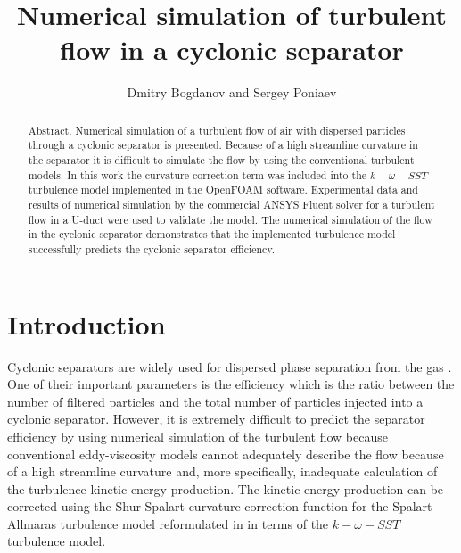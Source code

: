 \documentclass[a4paper]{jpconf}
\begin{document}

\title{Numerical simulation of turbulent flow in a cyclonic separator}

\author{Dmitry Bogdanov and Sergey Poniaev}

\address{Division of Plasma Physics, Atomic Physics and Astrophysics, Ioffe Physical Technical Institute, 26 Polytekhnicheskaya, St Petersburg 194021, Russian Federation}


\begin{abstract}
Abstract. Numerical simulation of a turbulent flow of air with dispersed particles through 
a cyclonic separator is presented. Because of a high streamline curvature in the separator it 
is difficult to simulate the flow by using the conventional turbulent models. In this work the 
curvature correction term was included into the $k-\omega-SST$ turbulence model implemented in 
the OpenFOAM{\textregistered} software. Experimental data and results of numerical simulation by the
commercial ANSYS Fluent{\textregistered} solver for a turbulent flow in a U-duct were used to validate the 
model. The numerical simulation of the flow in the cyclonic separator demonstrates that the 
implemented turbulence model successfully predicts the cyclonic separator efficiency.
\end{abstract}
\section{Introduction}
Cyclonic separators are widely used for dispersed phase separation from the gas \cite{instructions} . One of 
their important parameters is the efficiency which is the ratio between the number of filtered 
particles and the total number of particles injected into a cyclonic separator. However, it is 
extremely difficult to predict the separator efficiency by using numerical simulation of the 
turbulent flow because conventional eddy-viscosity models cannot adequately describe the 
flow \cite{ShurSpallart} because of a high streamline curvature and, more specifically, inadequate calculation  of the turbulence kinetic energy production. The kinetic energy production can be corrected using the Shur-Spalart curvature correction function for the Spalart-Allmaras turbulence model reformulated in \cite{Smirnov} in terms of the $k-\omega-SST$ turbulence model.
\end{document}
